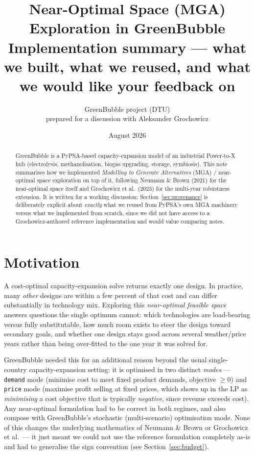 \documentclass[11pt]{article}
\title{\textbf{Near-Optimal Space (MGA) Exploration in GreenBubble}\\[4pt]
\large Implementation summary --- what we built, what we reused, and what we would like your feedback on}
\author{GreenBubble project (DTU) \\ prepared for a discussion with Aleksander Grochowicz}
\date{August 2026}
\begin{document}
\maketitle
\thispagestyle{fancy}

\begin{abstract}
\noindent
GreenBubble is a PyPSA-based capacity-expansion model of an industrial
Power-to-X hub (electrolysis, methanolisation, biogas upgrading, storage,
symbiosis). This note summarises how we implemented \emph{Modelling to
Generate Alternatives} (MGA) / near-optimal space exploration on top of it,
following Neumann \& Brown (2021) for the near-optimal space itself and
Grochowicz et al.\ (2023) for the multi-year robustness extension. It is
written for a working discussion: Section~\ref{sec:provenance} is
deliberately explicit about \emph{exactly} what we reused from PyPSA's own
MGA machinery versus what we implemented from scratch, since we did not have
access to a Grochowicz-authored reference implementation and would value
comparing notes.
\end{abstract}

\tableofcontents

\section{Motivation}
A cost-optimal capacity-expansion solve returns exactly one design. In
practice, many \emph{other} designs are within a few percent of that cost
and can differ substantially in technology mix. Exploring this
\emph{near-optimal feasible space} answers questions the single optimum
cannot: which technologies are load-bearing versus fully substitutable, how
much room exists to steer the design toward secondary goals, and whether one
design stays good across several weather/price years rather than being
over-fitted to the one year it was solved for.

GreenBubble needed this for an additional reason beyond the usual
single-country capacity-expansion setting: it is optimised in two distinct
\emph{modes} --- \texttt{demand} mode (minimise cost to meet fixed product
demands, objective $\geq 0$) and \texttt{price} mode (maximise profit
selling at fixed prices, which shows up in the LP as \emph{minimising} a
cost objective that is typically \emph{negative}, since revenue exceeds
cost). Any near-optimal formulation had to be correct in both regimes, and
also compose with GreenBubble's stochastic (multi-scenario) optimisation
mode. None of this changes the underlying mathematics of Neumann \& Brown or
Grochowicz et al.\ --- it just meant we could not use the reference
formulation completely as-is and had to generalise the sign convention (see
Section~\ref{sec:budget}).
\end{document}
